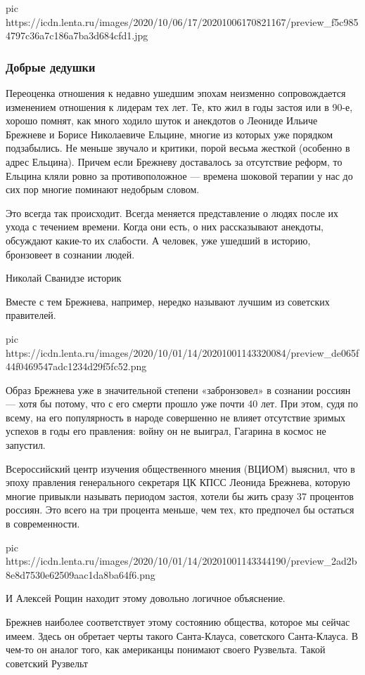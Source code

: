 \ifcmt
pic https://icdn.lenta.ru/images/2020/10/06/17/20201006170821167/preview_f5c9854797c36a7c186a7ba3d684cfd1.jpg
\fi

\subsubsection{Добрые дедушки}

Переоценка отношения к недавно ушедшим эпохам неизменно сопровождается
изменением отношения к лидерам тех лет. Те, кто жил в годы застоя или в 90-е,
хорошо помнят, как много ходило шуток и анекдотов о Леониде Ильиче Брежневе и
Борисе Николаевиче Ельцине, многие из которых уже порядком подзабылись. Не
меньше звучало и критики, порой весьма жесткой (особенно в адрес Ельцина).
Причем если Брежневу доставалось за отсутствие реформ, то Ельцина кляли ровно
за противоположное --- времена шоковой терапии у нас до сих пор многие поминают
недобрым словом.

Это всегда так происходит. Всегда меняется представление о людях после их ухода
с течением времени. Когда они есть, о них рассказывают анекдоты, обсуждают
какие-то их слабости. А человек, уже ушедший в историю, бронзовеет в сознании
людей.

Николай Сванидзе историк

Вместе с тем Брежнева, например, нередко называют лучшим из советских
правителей.

\ifcmt
pic https://icdn.lenta.ru/images/2020/10/01/14/20201001143320084/preview_de065f44f0469547adc1234d29f5fc52.png
\fi

Образ Брежнева уже в значительной степени «забронзовел» в сознании россиян —
хотя бы потому, что с его смерти прошло уже почти 40 лет. При этом, судя по
всему, на его популярность в народе совершенно не влияет отсутствие зримых
успехов в годы его правления: войну он не выиграл, Гагарина в космос не
запустил.

Всероссийский центр изучения общественного мнения (ВЦИОМ) выяснил, что в эпоху
правления генерального секретаря ЦК КПСС Леонида Брежнева, которую многие
привыкли называть периодом застоя, хотели бы жить сразу 37 процентов россиян.
Это всего на три процента меньше, чем тех, кто предпочел бы остаться в
современности.

\ifcmt
pic https://icdn.lenta.ru/images/2020/10/01/14/20201001143344190/preview_2ad2b8e8d7530e62509aac1da8ba64f6.png
\fi

И Алексей Рощин находит этому довольно логичное объяснение.

Брежнев наиболее соответствует этому состоянию общества, которое мы сейчас
имеем. Здесь он обретает черты такого Санта-Клауса, советского Санта-Клауса. В
чем-то он аналог того, как американцы понимают своего Рузвельта. Такой
советский Рузвельт

